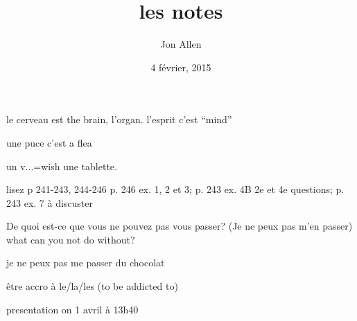 \documentclass[letterpaper]{article}
\begin{document}
\title{les notes}
\date{4 février, 2015}
\author{Jon Allen}
\maketitle
le cerveau est the brain, l'organ. l'esprit c'est ``mind''

une puce c'est a flea

un v...=wish
une tablette.

lisez p 241-243, 244-246
p. 246 ex. 1, 2 et 3;  p. 243 ex. 4B 2e et 4e questions; p. 243 ex. 7 à discuster

De quoi est-ce que vous ne pouvez pas vous passer? (Je ne peux pas m'en passer)
what can you not do without?

je ne peux pas me passer du chocolat

être accro à le/la/les (to be addicted to)

presentation on 1 avril à 13h40
\end{document}
